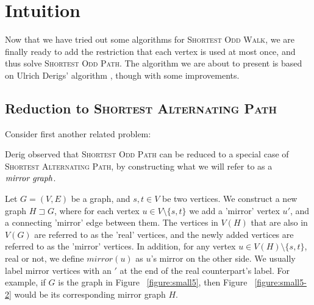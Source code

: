 \section{Intuition}
Now that we have tried out some algorithms for \textsc{Shortest Odd Walk}, we are finally ready to add the restriction that each vertex is used at most once, and thus solve \textsc{Shortest Odd Path}. The algorithm we are about to present is based on Ulrich Derigs' algorithm \cite{source:derigs_shortest_odd_path}, though with some improvements.

\subsection{Reduction to \textsc{Shortest Alternating Path}}
\label{subsection:reduction}
Consider first another related problem:


Derig observed that \textsc{Shortest Odd Path} can be reduced to a special case of \textsc{Shortest Alternating Path}, by constructing what we will refer to as a $\emph{mirror graph}$.

\begin{definition}
    Let $G = (V, E)$ be a graph, and $s,t \in V$ be two vertices.
    We construct a new graph $H \sqsupset G$, where for each vertex $u \in V \setminus \{s,t\}$ we add a 'mirror' vertex $u'$, and a connecting 'mirror' edge between them. 
    The vertices in $V(H)$ that are also in $V(G)$ are referred to as the 'real' vertices, and the newly added vertices are referred to as the 'mirror' vertices. In addition, for any vertex $u \in V(H) \setminus \{s,t\}$, real or not, we define $mirror(u)$ as $u$'s mirror on the other side. We usually label mirror vertices with an $'$ at the end of the real counterpart's label.
    For example, if $G$ is the graph in Figure ~\ref{figure:small5}, then Figure ~\ref{figure:small5-2} would be its corresponding mirror graph $H$.
\end{definition}

